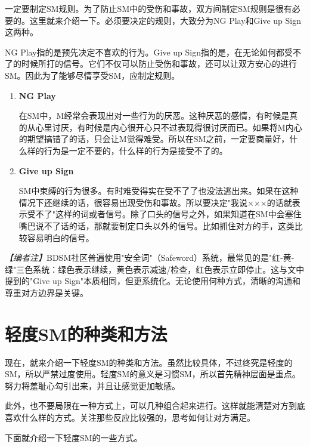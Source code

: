 \documentclass[12pt,UTF8]{ctexbook}
\begin{document}
一定要制定SM规则。为了防止SM中的受伤和事故，双方间制定SM规则是很有必要的。这里就来介绍一下。必须要决定的规则，大致分为NG Play和Give up Sign这两种。

NG Play指的是预先决定不喜欢的行为。Give up Sign指的是，在无论如何都受不了的时候所打的信号。它们不仅可以防止受伤和事故，还可以让双方安心的进行SM。因此为了能够尽情享受SM，应制定规则。

\begin{enumerate}
	\item \textbf{NG Play}

	在SM中，M经常会表现出对一些行为的厌恶。这种厌恶的感情，有时候是真的从心里讨厌，有时候是内心很开心只不过表现得很讨厌而已。如果将M内心的期望搞错了的话，只会让M觉得难受。所以在SM之前，一定要商量好，什么样的行为是一定不要的，什么样的行为是接受不了的。

	\item \textbf{Give up Sign}

	SM中束缚的行为很多。有时难受得实在受不了了也没法逃出来。如果在这种情况下还继续的话，很容易出现受伤和事故。所以要决定"我说×××的话就表示受不了"这样的词或者信号。除了口头的信号之外，如果知道在SM中会塞住嘴巴说不了话的话，那就要制定口头以外的信号。比如抓住对方的手，这类比较容易明白的信号。
\end{enumerate}

\textit{【编者注】}BDSM社区普遍使用"安全词"（Safeword）系统，最常见的是"红-黄-绿"三色系统：绿色表示继续，黄色表示减速/检查，红色表示立即停止。这与文中提到的"Give up Sign"本质相同，但更系统化。无论使用何种方式，清晰的沟通和尊重对方边界是关键。

\section{轻度SM的种类和方法}

现在，就来介绍一下轻度SM的种类和方法。虽然比较具体，不过终究是轻度的SM，所以严禁过度使用。轻度SM的意义是习惯SM，所以首先精神层面是重点。努力将羞耻心勾引出来，并且让感觉更加敏感。

此外，也不要局限在一种方式上，可以几种组合起来进行。这样就能清楚对方到底喜欢什么样的方式。关注那些反应比较强的，思考如何让对方满足。

下面就介绍一下轻度SM的一些方式。
\end{document}
